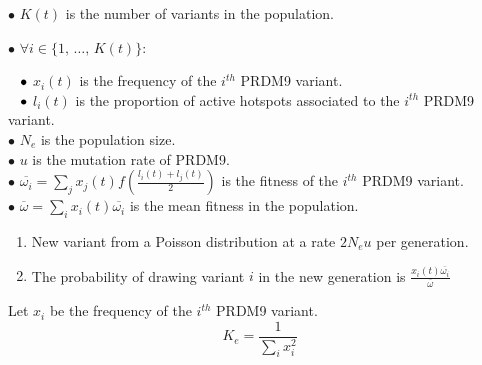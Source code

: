 \documentclass[10pt]{beamer}
\begin{document}
\begin{frame}
\vspace{2cm}
	$\bullet$ $ K(t)$ is the number of variants in the population.
	
	$\bullet$ $\forall i \in \{ 1, \, \dots, \, K(t) \}$:
		
	$\hspace{0.3cm}  \bullet$ $x_i(t)$ is the frequency of the $i^{th}$ PRDM9 variant.\\
	
	$\hspace{0.3cm} \bullet$ $l_i(t)$ is the proportion of active hotspots  associated to the $i^{th}$ PRDM9 variant.\\
	
	$\bullet$ $N_e$ is the population size.\\
	
	$\bullet$ $u$ is the mutation rate of PRDM9.\\

	$\bullet$ $\overline{\omega_i}=\sum_j x_j(t) f \left( \tfrac{l_i(t) + l_j(t)}{2} \right)$ is the fitness of the $i^{th}$ PRDM9 variant.\\
	
	$\bullet$ $\overline{\omega}=\sum_{i} x_i(t) \overline{\omega_i}$ is the mean fitness in the population.\\
		\begin{enumerate}
	\item New variant from a Poisson distribution at a rate $ 2 N_e u $ per generation. \\
	\item The probability of drawing variant $i$ in the new generation is $ \tfrac{x_i(t) \overline{\omega_i}}{\overline{\omega}} $
		\end{enumerate}
\end{frame}

\begin{frame}
\vspace{2cm}
	Let $x_i$ be the frequency of the $i^{th}$ PRDM9 variant.\\

    \[ K_e = \dfrac{1}{\displaystyle \sum_i x_i^2}   \]
\end{frame}
\end{document}
